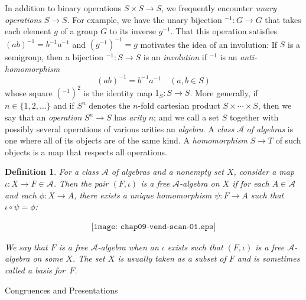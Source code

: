 \documentclass{surv-l}
\numberwithin{equation}{section}
\numberwithin{table}{section}
\numberwithin{figure}{section}
\theoremstyle{plain}
\newtheorem{definition}[equation]{Definition}
\theoremstyle{definition}
\begin{document}
In addition to binary operations $S \times S \rightarrow S$, we
frequently encounter \emph{unary operations} $S \rightarrow S$.
For example, we have the unary bijection $^{-1} : G\rightarrow G$
that takes each element $g$ of a group $G$ to its inverse
$g^{-1}$. That this operation satisfies $(ab)^{-1}=b^{-1}a^{-1}$
and $(g^{-1})^{-1}=g$ motivates the idea of an involution: If $S$
is a semigroup, then a bijection $^{-1} : S \rightarrow S$ is an
\emph{involution} if $^{-1}$ is an
\emph{anti-homomorphism}
\[
(ab)^{-1}=b^{-1}a^{-1}\quad (a, b\in S)
\]
whose square $(^{-1})^{2}$ is the identity map $1_{S} : S
\rightarrow S$. More generally, if $n \in\{1, 2, \ldots\}$ and if
$S^{n}$ denotes the $n$-fold cartesian product $S
\times\cdots\times S$, then we say that an
\emph{operation} $S^{n}\rightarrow
S$ has \emph{arity} $n$; and we call a set $S$ together with
possibly several operations of various arities an
\emph{algebra}. A
\emph{class} $\mathcal{A}$ \emph{of algebras} is one where all of its objects are of the same kind. A
\emph{homomorphism} $S\rightarrow T$ of such
objects is a map that respects all operations.

\begin{definition}\label{defn9.42.1}
For a class $\mathcal{A}$ of algebras and a nonempty set $X$,
consider a map $\iota : X\rightarrow F\in \mathcal{A}$. Then the
pair $(F,\iota)$ is a free $\mathcal{A}$-algebra on $X$ if for
each $A\in \mathcal{A}$ and each $\phi : X\rightarrow A$, there
exists a unique homomorphism $\psi : F\rightarrow A$ such that
$\iota \circ\psi=\phi$:

\begin{align*}
\texttt{[image: chap09-vend-scan-01.eps]}
\end{align*}

\noindent We say that $F$ is a free $\mathcal{A}$-algebra when an $\iota$
exists such that $(F,\iota)$ is a free
$\mathcal{A}$-algebra on some $X$. The set $X$
is usually taken as a subset of $F$ and is sometimes called a
basis for~$F$.
\end{definition}

Congruences and Presentations
\end{document}
